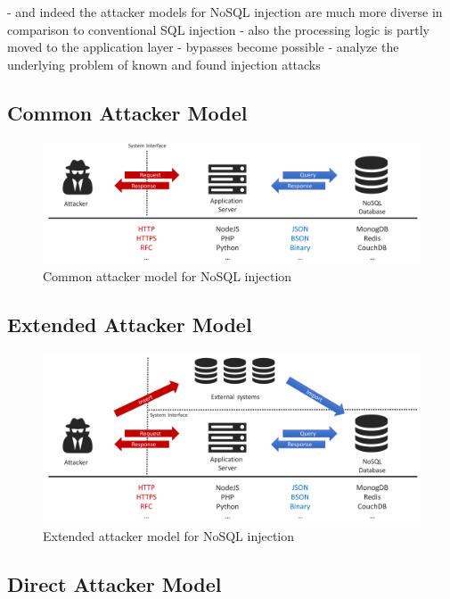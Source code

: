 - and indeed the attacker models for NoSQL injection are much more diverse in comparison to conventional SQL injection
- also the processing logic is partly moved to the application layer
- bypasses become possible
- analyze the underlying problem of known and found injection attacks

\subsection{Common Attacker Model}

\begin{figure}[h]
\centering
  \includegraphics[width=1\linewidth]{Images/attacker_model_normal}
  \caption{Common attacker model for NoSQL injection}
  \label{fig:normalAttackerModel}
\end{figure}


\subsection{Extended Attacker Model}

\begin{figure}[h]
\centering
  \includegraphics[width=1\linewidth]{Images/attacker_model_extended}
  \caption{Extended attacker model for NoSQL injection}
  \label{fig:extendedAttackerModel}
\end{figure}


\subsection{Direct Attacker Model}

